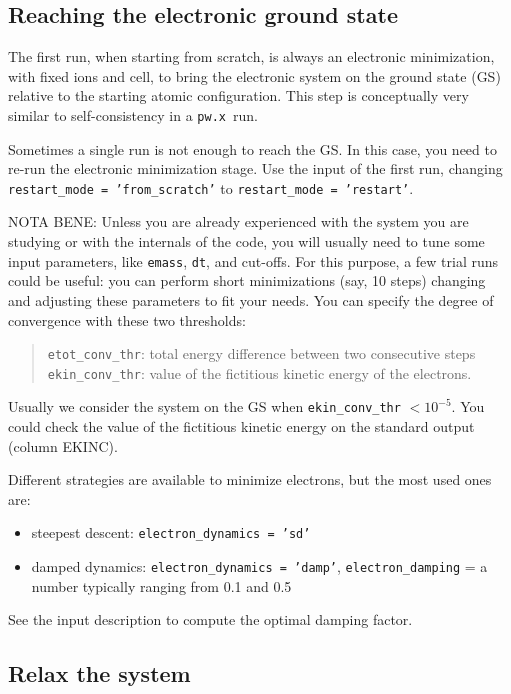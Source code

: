\documentclass[12pt,a4paper]{article}
\def\pwx{\texttt{pw.x}}
\begin{document}
\subsection{Reaching the electronic ground state}

The first run, when starting from scratch, is always an electronic 
minimization, with fixed ions and cell, to bring the electronic system on the ground state (GS) relative to the starting atomic configuration. This step is conceptually very similar to
self-consistency in a \pwx\ run.

Sometimes a single run is not enough to reach the GS. In this case,
you need to re-run the electronic minimization stage. Use the input 
of the first run, changing \texttt{restart\_mode = 'from\_scratch'}
to \texttt{restart\_mode = 'restart'}.
   
NOTA BENE: Unless you are already experienced with the system 
you are studying or with the internals of the code, you will usually need 
to tune some input parameters, like \texttt{emass}, \texttt{dt}, and cut-offs. For this 
purpose, a few trial runs could be useful: you can perform short
minimizations (say, 10 steps) changing and adjusting these parameters 
to fit your needs. You can specify the degree of convergence with these
two thresholds:
\begin{quote}
\texttt{etot\_conv\_thr}: total energy difference between two consecutive steps\\
\texttt{ekin\_conv\_thr}: value of the fictitious kinetic energy of the electrons.
\end{quote}
   
Usually we consider the system on the GS when 
\texttt{ekin\_conv\_thr} $ < 10^{-5}$.
You could check the value of the fictitious kinetic energy on the standard 
output (column EKINC).

Different strategies are available to minimize electrons, but the most used 
ones are:
\begin{itemize}
\item steepest descent: \texttt{electron\_dynamics = 'sd'}
\item damped dynamics: \texttt{electron\_dynamics = 'damp'},
\texttt{electron\_damping} = a number typically ranging from 0.1 and 0.5 
\end{itemize}
See the input description to compute the optimal damping factor.

\subsection{Relax the system}
\end{document}
